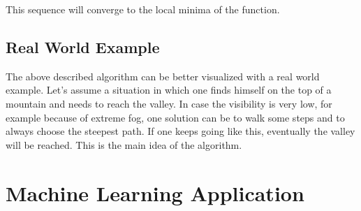 \documentclass[conference]{IEEEtran}
\begin{document}
This sequence will converge to the local minima of the function.\cite{Wikipedia}
\subsection{Real World Example}
The above described algorithm can be better visualized with a real world example.
Let's assume a situation in which one finds himself on the top of a mountain and needs to reach the valley. In case the visibility is very low, for example because of extreme fog, one solution can be to walk some steps and to always choose the steepest path. If one keeps going like this, eventually the valley will be reached. This is the main idea of the algorithm. 



\section{Machine Learning Application}
\end{document}
